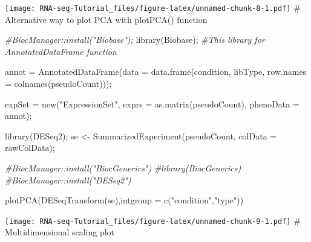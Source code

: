 \documentclass[
]{article}
\newenvironment{Shaded}{\begin{snugshade}}{\end{snugshade}}
\newcommand{\AttributeTok}[1]{\textcolor[rgb]{0.77,0.63,0.00}{#1}}
\newcommand{\CommentTok}[1]{\textcolor[rgb]{0.56,0.35,0.01}{\textit{#1}}}
\newcommand{\FunctionTok}[1]{\textcolor[rgb]{0.00,0.00,0.00}{#1}}
\newcommand{\NormalTok}[1]{#1}
\newcommand{\OtherTok}[1]{\textcolor[rgb]{0.56,0.35,0.01}{#1}}
\newcommand{\StringTok}[1]{\textcolor[rgb]{0.31,0.60,0.02}{#1}}
\begin{document}
\texttt{[image: RNA-seq-Tutorial\_files/figure-latex/unnamed-chunk-8-1.pdf]}
\# Alternative way to plot PCA with plotPCA() function

\begin{Shaded}
\begin{Highlighting}[]
\CommentTok{\#BiocManager::install("Biobase");}
\FunctionTok{library}\NormalTok{(Biobase); }\CommentTok{\#This library for AnnotatedDataFrame function}

\NormalTok{annot }\OtherTok{=} \FunctionTok{AnnotatedDataFrame}\NormalTok{(}\AttributeTok{data =} \FunctionTok{data.frame}\NormalTok{(condition, libType,}
\AttributeTok{row.names =} \FunctionTok{colnames}\NormalTok{(pseudoCount)));}

\NormalTok{expSet }\OtherTok{=} \FunctionTok{new}\NormalTok{(}\StringTok{"ExpressionSet"}\NormalTok{, }\AttributeTok{exprs =} \FunctionTok{as.matrix}\NormalTok{(pseudoCount), }\AttributeTok{phenoData =}\NormalTok{ annot);}

\FunctionTok{library}\NormalTok{(DESeq2);}
\NormalTok{se }\OtherTok{\textless{}{-}} \FunctionTok{SummarizedExperiment}\NormalTok{(pseudoCount, }\AttributeTok{colData =}\NormalTok{ rawColData);}

\CommentTok{\#BiocManager::install("BiocGenerics")}
\CommentTok{\#library(BiocGenerics)}
\CommentTok{\#BiocManager::install("DESeq2")}

\FunctionTok{plotPCA}\NormalTok{(}\FunctionTok{DESeqTransform}\NormalTok{(se),}\AttributeTok{intgroup =} \FunctionTok{c}\NormalTok{(}\StringTok{"condition"}\NormalTok{,}\StringTok{"type"}\NormalTok{))}
\end{Highlighting}
\end{Shaded}

\texttt{[image: RNA-seq-Tutorial\_files/figure-latex/unnamed-chunk-9-1.pdf]}
\# Multidimensional scaling plot
\end{document}
